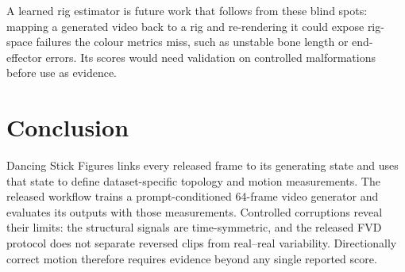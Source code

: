 \documentclass[10pt,twocolumn]{article}
\begin{document}
A learned rig estimator is future work that follows from these blind spots: mapping a generated video back to
a rig and re-rendering it could expose rig-space failures the colour metrics miss, such as unstable bone
length or end-effector errors. Its scores would need validation on controlled malformations before use as
evidence.

\section{Conclusion}
Dancing Stick Figures links every released frame to its generating state and uses that state to define
dataset-specific topology and motion measurements. The released workflow trains a prompt-conditioned
64-frame video generator and evaluates its outputs with those measurements. Controlled corruptions reveal
their limits: the structural signals are time-symmetric, and the released FVD protocol does not separate
reversed clips from real--real variability. Directionally correct motion therefore requires evidence beyond
any single reported score.
\end{document}
